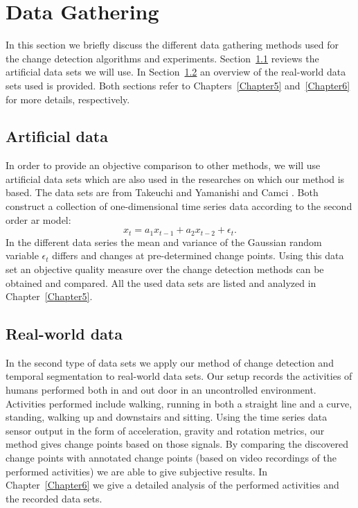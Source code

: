 \section{Data Gathering}\label{sec:method_data_gathering}
In this section we briefly discuss the different data gathering methods used for the change detection algorithms and experiments.
Section~\ref{subsec:data_gathering_artificial} reviews the artificial data sets we will use.
In Section~\ref{subsec:data_gathering_real_world} an overview of the real-world data sets used is provided.
Both sections refer to Chapters~\ref{Chapter5} and~\ref{Chapter6} for more details, respectively.

\subsection{Artificial data}\label{subsec:data_gathering_artificial}
In order to provide an objective comparison to other methods, we will use artificial data sets which are also used in the researches on which our method is based.
The data sets are from Takeuchi and Yamanishi \cite{takeuchi2006unifying} and Camci \cite{camci2010change}.
Both construct a collection of one-dimensional time series data according to the second order \gls{ar} model:
\begin{equation}
  x_t = a_1 x_{t-1} + a_2 x_{t-2} + \epsilon_t.
\end{equation}
In the different data series the mean and variance of the Gaussian random variable $\epsilon_t$ differs and changes at pre-determined change points.
Using this data set an objective quality measure over the change detection methods can be obtained and compared.
All the used data sets are listed and analyzed in Chapter~\ref{Chapter5}.

\subsection{Real-world data}\label{subsec:data_gathering_real_world}
In the second type of data sets we apply our method of change detection and temporal segmentation to real-world data sets.
Our setup records the activities of humans performed both in and out door in an uncontrolled environment.
Activities performed include walking, running in both a straight line and a curve, standing, walking up and downstairs and sitting.
Using the time series data sensor output in the form of acceleration, gravity and rotation metrics, our method gives change points based on those signals.
By comparing the discovered change points with annotated change points (based on video recordings of the performed activities) we are able to give subjective results.
In Chapter~\ref{Chapter6} we give a detailed analysis of the performed activities and the recorded data sets.